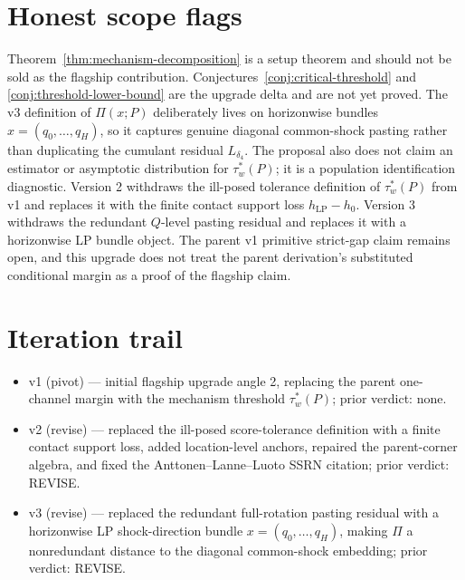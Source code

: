 \documentclass[11pt]{article}
\theoremstyle{definition}
\theoremstyle{plain}
\theoremstyle{remark}
\begin{document}
\section{Honest scope flags}
Theorem~\ref{thm:mechanism-decomposition} is a setup theorem and should not be sold as the flagship contribution.  Conjectures~\ref{conj:critical-threshold} and \ref{conj:threshold-lower-bound} are the upgrade delta and are not yet proved.  The v3 definition of \(\Pi(x;P)\) deliberately lives on horizonwise bundles \(x=(q_0,\ldots,q_H)\), so it captures genuine diagonal common-shock pasting rather than duplicating the cumulant residual \(L_{\delta_4}\).  The proposal also does not claim an estimator or asymptotic distribution for \(\tau_w^*(P)\); it is a population identification diagnostic.  Version 2 withdraws the ill-posed tolerance definition of \(\tau_w^*(P)\) from v1 and replaces it with the finite contact support loss \(h_{\mathrm{LP}}-h_0\).  Version 3 withdraws the redundant \(Q\)-level pasting residual and replaces it with a horizonwise LP bundle object.  The parent v1 primitive strict-gap claim remains open, and this upgrade does not treat the parent derivation's substituted conditional margin as a proof of the flagship claim.

\section{Iteration trail}
\begin{itemize}[leftmargin=*]
\item v1 (pivot) --- initial flagship upgrade angle 2, replacing the parent one-channel margin with the mechanism threshold \(\tau_w^*(P)\); prior verdict: none.
\item v2 (revise) --- replaced the ill-posed score-tolerance definition with a finite contact support loss, added location-level anchors, repaired the parent-corner algebra, and fixed the Anttonen--Lanne--Luoto SSRN citation; prior verdict: REVISE.
\item v3 (revise) --- replaced the redundant full-rotation pasting residual with a horizonwise LP shock-direction bundle \(x=(q_0,\ldots,q_H)\), making \(\Pi\) a nonredundant distance to the diagonal common-shock embedding; prior verdict: REVISE.
\end{itemize}
\end{document}
